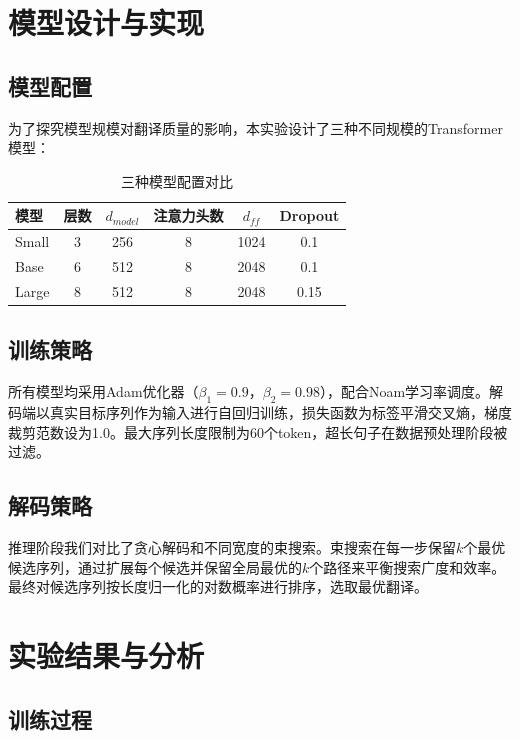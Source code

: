 \documentclass[12pt,a4paper]{article}
\begin{document}
\section{模型设计与实现}

\subsection{模型配置}

为了探究模型规模对翻译质量的影响，本实验设计了三种不同规模的Transformer模型：

\begin{table}[H]
    \centering
    \begin{tabular}{lccccc}
        \toprule
        模型 & 层数 & $d_{model}$ & 注意力头数 & $d_{ff}$ & Dropout \\
        \midrule
        Small & 3 & 256 & 8 & 1024 & 0.1 \\
        Base & 6 & 512 & 8 & 2048 & 0.1 \\
        Large & 8 & 512 & 8 & 2048 & 0.15 \\
        \bottomrule
    \end{tabular}
    \caption{三种模型配置对比}
\end{table}

\subsection{训练策略}

所有模型均采用Adam优化器（$\beta_1=0.9$，$\beta_2=0.98$），配合Noam学习率调度。解码端以真实目标序列作为输入进行自回归训练，损失函数为标签平滑交叉熵，梯度裁剪范数设为1.0。最大序列长度限制为60个token，超长句子在数据预处理阶段被过滤。

\subsection{解码策略}

推理阶段我们对比了贪心解码和不同宽度的束搜索。束搜索在每一步保留$k$个最优候选序列，通过扩展每个候选并保留全局最优的$k$个路径来平衡搜索广度和效率。最终对候选序列按长度归一化的对数概率进行排序，选取最优翻译。

\section{实验结果与分析}

\subsection{训练过程}
\end{document}
